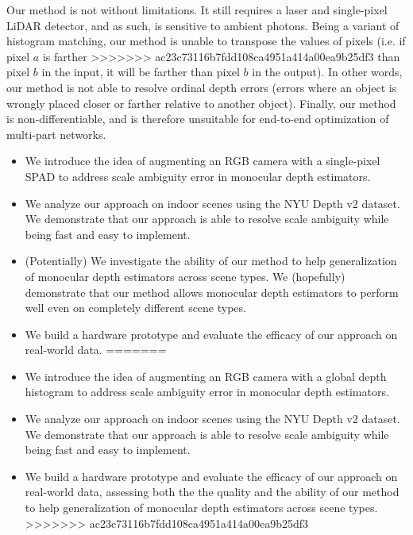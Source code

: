 Our method is not without limitations. It still requires a laser and
single-pixel LiDAR detector, and as such, is sensitive to ambient photons. Being 
a variant of histogram matching, our method is unable to transpose the
values of pixels (i.e. if pixel $a$ is farther
>>>>>>> ac23c73116b7fdd108ca4951a414a00ea9b25df3
than pixel $b$ in the input, it will be farther than pixel $b$ in the output).
In other words, our method is not able to resolve ordinal depth errors
(errors where an object is wrongly placed closer or farther
relative to another object). Finally, our method is non-differentiable, and is
therefore unsuitable for end-to-end optimization of multi-part networks.

\begin{itemize}
<<<<<<< HEAD
	\item We introduce the idea of augmenting an RGB camera with a single-pixel
    SPAD to address scale ambiguity error in monocular depth estimators.	
  \item We analyze our approach on indoor scenes using the NYU Depth v2 dataset.
    We demonstrate that our approach is able to resolve scale ambiguity while
    being fast and easy to implement.
  \item (Potentially) We investigate the ability of our method to 
    help generalization of monocular depth estimators across scene types. 
    We (hopefully) demonstrate that our method allows monocular depth
    estimators to perform well even on completely different scene types.
	\item We build a hardware prototype and evaluate the efficacy of our
    approach on real-world data. 
=======
	\item We introduce the idea of augmenting an RGB camera with a global depth 
    histogram to address scale ambiguity error in monocular depth estimators.	
  \item We analyze our approach on indoor scenes using the NYU Depth v2 dataset.
    We demonstrate that our approach is able to resolve scale ambiguity while
    being fast and easy to implement.
	\item We build a hardware prototype and evaluate the efficacy of our
    approach on real-world data, assessing both the the quality and the ability of our method
    to help generalization of monocular depth estimators across scene types. 
>>>>>>> ac23c73116b7fdd108ca4951a414a00ea9b25df3
\end{itemize}


